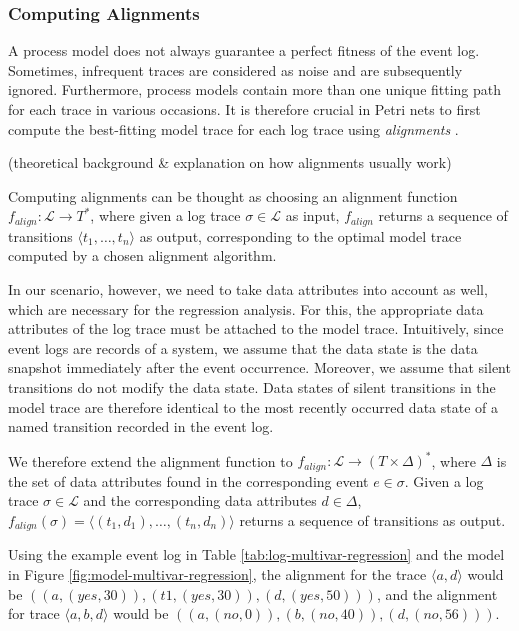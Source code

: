 \subsubsection*{Computing Alignments}

A process model does not always guarantee a perfect fitness of the event log. Sometimes, infrequent traces are considered as noise and are subsequently ignored. Furthermore, process models contain more than one unique fitting path for each trace in various occasions. It is therefore crucial in Petri nets to first compute the best-fitting model trace for each log trace using \emph{alignments} \cite{alignments}.

(theoretical background \& explanation on how alignments usually work)

Computing alignments can be thought as choosing an alignment function $f_{align} \colon \mathcal{L} \rightarrow T^*$, where given a log trace $\sigma \in \mathcal{L}$ as input, $f_{align}$ returns a sequence of transitions $\langle t_1, \dots, t_n \rangle$ as output, corresponding to the optimal model trace computed by a chosen alignment algorithm.

In our scenario, however, we need to take data attributes into account as well, which are necessary for the regression analysis. For this, the appropriate data attributes of the log trace must be attached to the model trace. Intuitively, since event logs are records of a system, we assume that the data state is the data snapshot immediately after the event occurrence. Moreover, we assume that silent transitions do not modify the data state. Data states of silent transitions in the model trace are therefore identical to the most recently occurred data state of a named transition recorded in the event log.

We therefore extend the alignment function to $f_{align} \colon \mathcal{L} \rightarrow (T \times \Delta)^*$, where $\Delta$ is the set of data attributes found in the corresponding event $e \in \sigma$. Given a log trace $\sigma \in \mathcal{L}$ and the corresponding data attributes $d \in \Delta$, $f_{align}(\sigma) = \langle (t_1, d_1), \dots, (t_n, d_n) \rangle$ returns a sequence of transitions as output.

Using the example event log in Table \ref{tab:log-multivar-regression} and the model in Figure \ref{fig:model-multivar-regression}, the alignment for the trace $\langle a, d \rangle$ would be $((a, (yes, 30)), (t1, (yes, 30)), (d, (yes, 50)))$, and the alignment for trace $\langle a, b, d \rangle$ would be $((a, (no, 0)), (b, (no, 40)), (d, (no, 56)))$.

